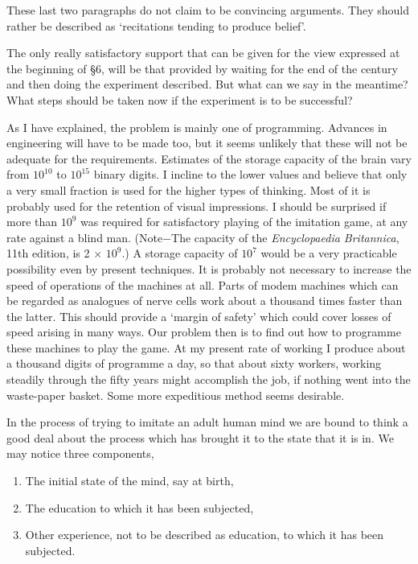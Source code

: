     These last two paragraphs do not claim to be convincing arguments. They should rather be described as ‘recitations tending to produce belief'.

    The only really satisfactory support that can be given for the view expressed at the beginning of \S 6, will be that provided by waiting for the end of the century and then doing the experiment described. But what can we say in the meantime? What steps should be taken now if the experiment is to be successful?

    As I have explained, the problem is mainly one of programming. Advances in engineering will have to be made too, but it seems unlikely that these will not be adequate for the requirements. Estimates of the storage capacity of the brain vary from $10^{10}$ to $10^{15}$ binary digits. I incline to the lower values and believe that only a very small fraction is used for the higher types of thinking. Most of it is probably used for the retention of visual impressions. I should be surprised if more than $10^9$ was required for satisfactory playing of the imitation game, at any rate against a blind man. (Note$-$The capacity of the \textit{Encyclopaedia Britannica}, 11th edition, is 2 $\times$ $10^9$.) A storage capacity of $10^7$ would be a very practicable possibility even by present techniques. It is probably not necessary to increase the speed of operations of the machines at all. Parts of modem machines which can be regarded as analogues of nerve cells work about a thousand times faster than the latter. This should provide a ‘margin of safety' which could cover losses of speed arising in many ways. Our problem then is to find out how to programme these machines to play the game. At my present rate of working I produce about a thousand digits of programme a day, so that about sixty workers, working steadily through the fifty years might accomplish the job, if nothing went into the waste-paper basket. Some more expeditious method seems desirable.

    In the process of trying to imitate an adult human mind we are bound to think a good deal about the process which has brought it to the state that it is in. We may notice three components,
    \begin{enumerate}[label=(\alph*)]
        \item{The initial state of the mind, say at birth,}
        \item{The education to which it has been subjected,}
        \item{Other experience, not to be described as education, to which it has been subjected.}
    \end{enumerate}

